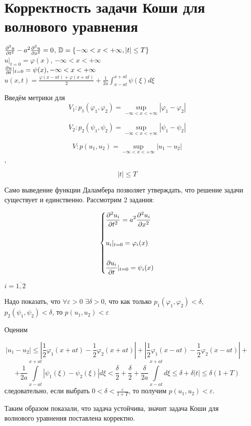 \documentclass[../main.tex]{subfiles}
\begin{document}
\section{Корректность задачи Коши для волнового уравнения}
\begin{large}
	\begin{center}
		$\frac{\partial^2 u}{\partial t^2}-a^2\frac{\partial^2 u}{\partial x^2}=0$, $\mathbb{D}=\{ -\infty<x<+\infty, |t|\leq T\rbrace$\\
		$ $\\
		$ u|_{t=0} = \varphi(x)$, $-\infty<x<+\infty$\\
		$ $\\
		$\frac{\partial u}{\partial t}|_{t=0} = \psi(x),  -\infty<x<+\infty$\\
		$ $\\
		$u(x,t)=\frac{\varphi(x-at)+\varphi(x+at)}{2}+\frac{1}{2a}\int_{x-at}^{x+at}\psi(\xi)d\xi$
	\end{center}
\end{large}
Введём метрики для
$$V_1:p_1(\varphi_1,\varphi_2)=\sup_{-\infty<x<+\infty}|\varphi_1-\varphi_2|$$

$$V_2:p_2(\psi_1,\psi_2)=\sup_{-\infty<x<+\infty}|\psi_1-\psi_2|$$

$$V:p(u_1,u_2)=\sup_{-\infty<x<+\infty}|u_1-u_2|$$,

$$|t| \leq T$$

Само выведение функции Даламбера позволяет утверждать, что решение задачи существует и единственно. Рассмотрим 2 задания:

$$\begin{dcases}
		\frac{\partial^2 u_i}{\partial t^2}=a^2\frac{\partial^2 u_i}{\partial x^2} \\\\
		u_i|_{t=0}=\varphi_i(x)              \\\\
		\frac{\partial u_i}{\partial t}|_{t=0}=\psi_i(x)
	\end{dcases} $$

$i=\overline{1,2}$

Надо показать, что $\forall \varepsilon > 0$  $\exists \delta > 0$,  что как только $p_1(\varphi_1, \varphi_2)<\delta$, $p_2(\psi_1, \psi_2)<\delta$, то $p(u_1, u_2)<\varepsilon$

Оценим

\[|u_1-u_2| \leq \left|\frac{1}{2}\varphi_1(x+at)-\frac{1}{2}\varphi_2(x+at)\right|+\left|\frac{1}{2}\varphi_1(x-at)-\frac{1}{2}\varphi_2(x-at)\right|+\]
\[+\frac{1}{2a}\int\limits_{x-at}^{x+at}|\psi_1(\xi)-\psi_2(\xi)|d\xi<\frac{\delta}{2}+\frac{\delta}{2}+\frac{\delta}{2a}\int\limits_{x-at}^{x+at}d\xi \leq \delta+\delta|t| \leq \delta(1+T)\] следовательно, если выбрать $0<\delta<\frac{\varepsilon}{1+T}$, то получим $p(u_1, u_2)<\varepsilon$.

Таким образом показали, что задача устойчива, значит задача Коши для волнового уравнения поставлена корректно.
\end{document}
